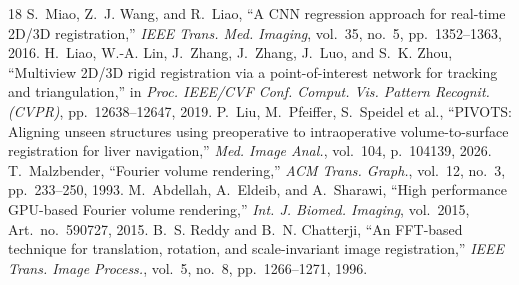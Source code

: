 \documentclass[journal,twoside,web]{ieeecolor}
\begin{document}
\begin{thebibliography}{18}
S.~Miao, Z.~J. Wang, and R.~Liao, ``A CNN regression approach for real-time 2D/3D registration,'' \emph{IEEE Trans. Med. Imaging}, vol.~35, no.~5, pp.~1352--1363, 2016.
H.~Liao, W.-A. Lin, J.~Zhang, J.~Zhang, J.~Luo, and S.~K. Zhou, ``Multiview 2D/3D rigid registration via a point-of-interest network for tracking and triangulation,'' in \emph{Proc. IEEE/CVF Conf. Comput. Vis. Pattern Recognit. (CVPR)}, pp.~12638--12647, 2019.
P.~Liu, M.~Pfeiffer, S.~Speidel et al., ``PIVOTS: Aligning unseen structures using preoperative to intraoperative volume-to-surface registration for liver navigation,'' \emph{Med. Image Anal.}, vol.~104, p.~104139, 2026.
T.~Malzbender, ``Fourier volume rendering,'' \emph{ACM Trans. Graph.}, vol.~12, no.~3, pp.~233--250, 1993.
M.~Abdellah, A.~Eldeib, and A.~Sharawi, ``High performance GPU-based Fourier volume rendering,'' \emph{Int. J. Biomed. Imaging}, vol.~2015, Art.~no.~590727, 2015.
B.~S. Reddy and B.~N. Chatterji, ``An FFT-based technique for translation, rotation, and scale-invariant image registration,'' \emph{IEEE Trans. Image Process.}, vol.~5, no.~8, pp.~1266--1271, 1996.
\end{thebibliography}
\end{document}
